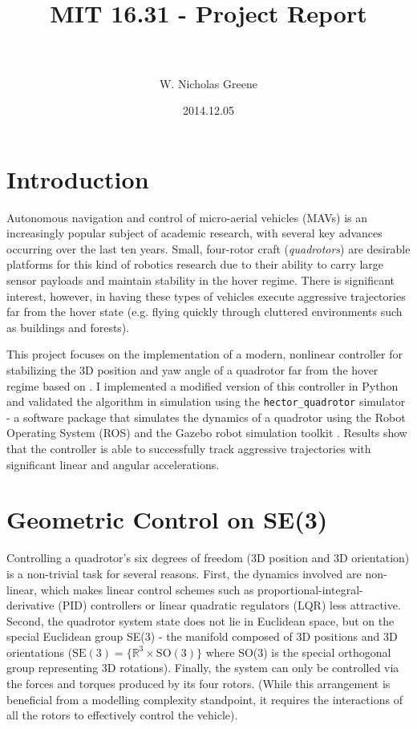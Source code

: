 \documentclass[paper=letter, fontsize=11pt]{scrartcl} %
\title{
\normalfont \normalsize
\horrule{0.5pt} \\[0.4cm] %
\huge MIT 16.31 - Project Report \\ %
\horrule{2pt} \\[0.5cm] %
}
\author{W. Nicholas Greene} %
\date{\normalsize2014.12.05} %
\numberwithin{equation}{section} %
\numberwithin{figure}{section} %
\numberwithin{table}{section} %
\begin{document}
\maketitle %

\section{Introduction}
Autonomous navigation and control of micro-aerial vehicles (MAVs) is an increasingly popular
subject of academic research, with several key advances occurring over the last ten years. 
Small, four-rotor craft (\textit{quadrotors}) are desirable platforms for this kind of 
robotics research due to their ability to carry large sensor payloads and maintain stability 
in the hover regime. There is significant interest, however, in having these types of vehicles 
execute aggressive trajectories far from the hover state (e.g. flying quickly through 
cluttered environments such as buildings and forests).

This project focuses on the implementation of a modern, nonlinear controller for stabilizing the
3D position and yaw angle of a quadrotor far from the hover regime based on \cite{lee2010geometric}. 
I implemented a modified version of this controller in Python and validated the algorithm 
in simulation using the \texttt{hector\_quadrotor} simulator - a software package that simulates the
dynamics of a quadrotor using the Robot Operating System (ROS) and the Gazebo robot
simulation toolkit \cite{2012simpar_meyer, quigley2009ros, koenig2004design}. Results
show that the controller is able to successfully track aggressive trajectories with 
significant linear and angular accelerations.

\section{Geometric Control on SE(3)}
Controlling a quadrotor's six degrees of freedom (3D position and 3D orientation) is a
non-trivial task for several reasons. First, the dynamics involved are non-linear, which
makes linear control schemes  such as proportional-integral-derivative (PID) controllers or 
linear quadratic regulators (LQR) less attractive. Second, the quadrotor system state
does not lie in Euclidean space, but on the special Euclidean group SE(3) - the manifold composed
of 3D positions and 3D orientations ($\textrm{SE}(3) = \{\mathbb{R}^3 \times \textrm{SO}(3)\}$
where SO(3) is the special orthogonal group representing 3D rotations).
Finally, the system can only be controlled via the forces and torques produced by its
four rotors. (While this arrangement is beneficial from a modelling complexity standpoint, 
it requires the interactions of all the rotors to effectively control the vehicle).
\end{document}
